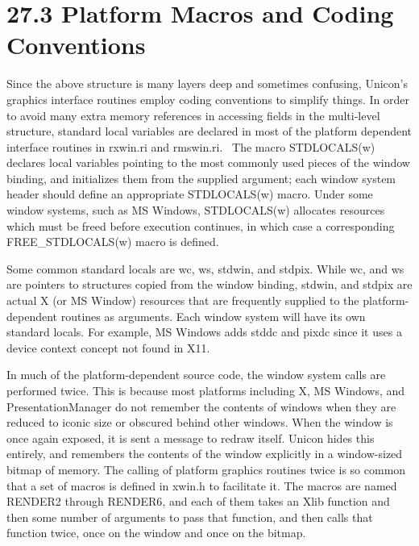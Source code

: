 \section[27.3 Platform Macros and Coding Conventions]{27.3 Platform Macros and Coding Conventions}

Since the above structure is many layers deep and sometimes confusing,
Unicon's graphics interface routines employ coding conventions to
simplify things. In order to avoid many extra memory references in
accessing fields in the multi-level structure,
{\textquotedbl}standard{\textquotedbl} local variables are declared in
most of the platform dependent interface routines in \textsf{rxwin.ri}
and \textsf{rmswin.ri}. \ The macro \textsf{STDLOCALS(w)} declares
local variables pointing to the most commonly used pieces of the
window binding, and initializes them from the supplied argument; each
window system header should define an appropriate
\textsf{STDLOCALS(w)} macro. Under some window systems, such as MS
Windows, \textsf{STDLOCALS(w)} allocates resources which must be freed
before execution continues, in which case a corresponding
\textsf{FREE\_STDLOCALS(w)} macro is defined.

Some common standard locals are \textsf{wc}, \textsf{ws},
\textsf{stdwin}, and \textsf{stdpix}. While \textsf{wc}, and
\textsf{ws} are pointers to structures copied from the window binding,
\textsf{stdwin}, and \textsf{stdpix} are actual X (or MS Window)
resources that are frequently supplied to the platform-dependent
routines as arguments. Each window system will have its own standard
locals. For example, MS Windows adds \textsf{stddc} and \textsf{pixdc}
since it uses a device context concept not found in X11.

In much of the platform-dependent source code, the window system calls
are performed twice. This is because most platforms including X, MS
Windows, and PresentationManager do not remember the contents of
windows when they are reduced to iconic size or obscured behind other
windows. When the window is once again exposed, it is sent a message
to redraw itself. Unicon hides this entirely, and remembers the
contents of the window explicitly in a window-sized bitmap of
memory. The calling of platform graphics routines twice is so common
that a set of macros is defined in \textsf{xwin.h} to facilitate it.
The macros are named \textsf{RENDER2} through \textsf{RENDER6}, and
each of them takes an Xlib function and then some number of arguments
to pass that function, and then calls that function twice, once on the
window and once on the bitmap.

